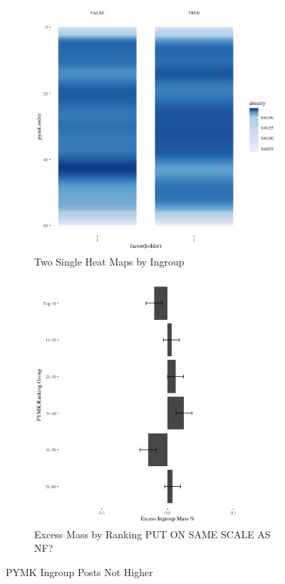 \documentclass[12pt,letterpaper]{article}
\begin{document}
\begin{figure}[ht]

    \begin{subfigure}{.5\textwidth} 
        \centering
        \includegraphics[width=1\linewidth]{Output/Graphs/Audit/Heatmaps/US PYMK pymk rank by ingroup - smooth.jpg}  
        \caption{Two Single Heat Maps by Ingroup}
        \label{fig:sub-first}
        \end{subfigure}
    \begin{subfigure}{.5\textwidth}
        \centering
        \includegraphics[width=.9\linewidth]{Output/Graphs/Audit/Excess Mass/US PYMK excess mass by ranking group.jpg}  
        \caption{Excess Mass by Ranking PUT ON SAME SCALE AS NF?}
        \label{fig:sub-second}
    \end{subfigure}
\caption{PYMK Ingroup Posts Not Higher}
\end{figure}
\end{document}
